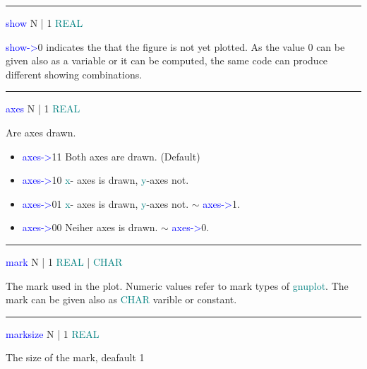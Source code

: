 \vspace{0.3cm} 
\hrule 
\vspace{0.3cm} 
\noindent \textcolor{blue}{show} \tabto{3cm}  N | 1  \tabto{5cm}   \textcolor{teal}{REAL}  \tabto{7cm} 
\begin{changemargin}{3cm}{0cm} 
\noindent  \textcolor{blue}{show->}0 indicates the that the figure is not yet plotted. 
As the value 0 can be given also as a variable or it can be computed, 
the same code can produce different showing combinations. 
\end{changemargin} 
\vspace{0.3cm} 
\hrule 
\vspace{0.3cm} 
\noindent \textcolor{blue}{axes}  \tabto{3cm}  N | 1  \tabto{5cm}  \textcolor{teal}{REAL}  \tabto{7cm} 
\begin{changemargin}{3cm}{0cm} 
\noindent  Are axes drawn. 
\begin{itemize} 
\item \textcolor{blue}{axes->}11 Both axes are drawn. (Default) 
\item \textcolor{blue}{axes->}10 \textcolor{teal}{x}- axes is  drawn, \textcolor{teal}{y}-axes not. 
\item \textcolor{blue}{axes->}01 \textcolor{teal}{x}- axes is  drawn, \textcolor{teal}{y}-axes not. $\sim$ \textcolor{blue}{axes->}1. 
\item \textcolor{blue}{axes->}00 Neiher axes is drawn. $\sim$ \textcolor{blue}{axes->}0. 
\end{itemize} 
\end{changemargin} 
\vspace{0.3cm} 
\hrule 
\vspace{0.3cm} 
\noindent \textcolor{blue}{mark}  \tabto{3cm}  N | 1  \tabto{5cm}   \textcolor{teal}{REAL} | \textcolor{teal}{CHAR}  \tabto{7cm} 
\begin{changemargin}{3cm}{0cm} 
\noindent  The mark used in the plot. Numeric values refer to 
mark types of \textcolor{teal}{gnuplot}. The mark can be given also as \textcolor{teal}{CHAR} varible or constant. 
\end{changemargin} 
\vspace{0.3cm} 
\hrule 
\vspace{0.3cm} 
\noindent \textcolor{blue}{marksize}  \tabto{3cm}  N | 1  \tabto{5cm}   \textcolor{teal}{REAL}  \tabto{7cm} 
\begin{changemargin}{3cm}{0cm} 
\noindent  The size of the mark, deafault 1 
\end{changemargin} 
\vspace{0.3cm} 
